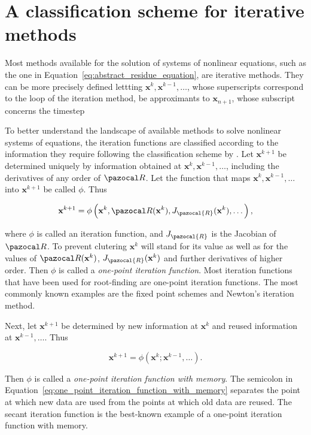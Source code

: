 \section{A classification scheme for iterative methods}

Most methods available for the solution of systems of nonlinear equations, such as the one in Equation~\eqref{eq:abstract_residue_equation}, are iterative methods.
They can be more precisely defined lettting \(\mathbf x^{k},\mathbf x^{k-1}, \ldots\), whose superscripts correspond to the loop of the iteration method, be approximants to \(\mathbf x_{n+1}\), whose subscript concerns the timestep

To better understand the landscape of available methods to solve nonlinear systems of equations, the iteration functions are classified according to the information they require following the classification scheme by \cite{traub_iterative_1982}.
Let \(\mathbf x^{k+1}\) be determined uniquely by information obtained at \(\mathbf x^{k}, \mathbf x^{k-1}, \ldots\), including the derivatives of any order of \(\pazocal R\).
Let the function that maps \(\mathbf x^{k}, \mathbf x^{k-1}, \ldots\) into \(\mathbf x^{k+1}\) be called \(\phi\).
Thus
\begin{highlight}
\begin{equation}
  \mathbf x^{k+1}=\phi\left(\mathbf x^{k},\pazocal R(\mathbf x^{k}), J_\pazocal{R}(\mathbf x^k), \dots\right),
\end{equation}
\end{highlight}
where \(\phi\) is called an iteration function, and \(J_\pazocal{R}\) is the Jacobian of \(\pazocal R\).
To prevent clutering \(\mathbf x^k\) will stand for its value as well as for the values of \(\pazocal R(\mathbf x^k)\), \(J_\pazocal{R}(\mathbf x^k)\) and further derivatives of higher order.
Then \(\phi\) is called a \textit{one-point iteration function}.
Most iteration functions that have been used for root-finding are one-point iteration functions. The most commonly known examples are the fixed point schemes and Newton's iteration method.

Next, let \(\mathbf x^{k+1}\) be determined by new information at \(\mathbf x^{k}\) and reused information at \(\mathbf x^{k-1}, \ldots\).
Thus
\begin{highlight}
  \begin{equation}\label{eq:one_point_iteration_function_with_memory}
    \mathbf x^{k+1}=\phi\left(\mathbf x^{k} ; \mathbf x^{k-1}, \ldots\right) .
  \end{equation}
\end{highlight}
Then \(\phi\) is called a \textit{one-point iteration function with memory}.
The semicolon in Equation~\eqref{eq:one_point_iteration_function_with_memory} separates the point at which new data are used from the points at which old data are reused.
The secant iteration function is the best-known example of a one-point iteration function with memory.

